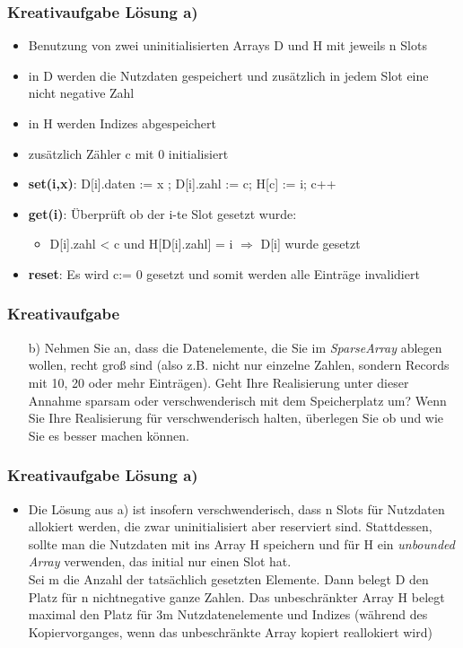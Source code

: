 \begin{frame}
	\frametitle{Kreativaufgabe Lösung a)}
	\begin{itemize}
		\item Benutzung von zwei uninitialisierten Arrays D und H mit jeweils n Slots
		\item in D werden die Nutzdaten gespeichert und zusätzlich in jedem Slot eine nicht negative Zahl
		\item in H werden Indizes abgespeichert
		\item zusätzlich Zähler c mit 0 initialisiert
		\item \textbf{set(i,x)}: D[i].daten := x ; D[i].zahl := c; H[c] := i; c++ 
		\item \textbf{get(i)}: Überprüft ob der i-te Slot gesetzt wurde:
			\begin{itemize}
				\item D[i].zahl < c und H[D[i].zahl] = i $\Rightarrow$ D[i] wurde gesetzt
			\end{itemize}
		\item \textbf{reset}: Es wird c:= 0 gesetzt und somit werden alle Einträge invalidiert

	\end{itemize}
\end{frame}

\begin{frame}
	\frametitle{Kreativaufgabe}

	\begin{itemize}
		\item[b)] Nehmen Sie an, dass die Datenelemente, die Sie im \textit{SparseArray} ablegen wollen, recht groß sind (also z.B. nicht nur einzelne Zahlen, sondern Records mit 10, 20 oder mehr Einträgen).
			Geht Ihre Realisierung unter dieser Annahme sparsam oder verschwenderisch mit dem Speicherplatz um? Wenn Sie Ihre Realisierung für verschwenderisch halten, überlegen Sie
			ob und wie Sie es besser machen können.
	\end{itemize}

\end{frame}
\begin{frame}
	\frametitle{Kreativaufgabe Lösung a)}
	\begin{itemize}
		\item Die Lösung aus a) ist insofern verschwenderisch, dass n Slots für Nutzdaten allokiert
		werden, die zwar uninitialisiert aber reserviert sind. Stattdessen, sollte man die Nutzdaten
		mit ins Array H speichern und für H ein \textit{unbounded Array} verwenden, das initial nur
		einen Slot hat.\\ Sei m die Anzahl der tatsächlich gesetzten Elemente. Dann belegt D den Platz für 
		n nichtnegative ganze Zahlen. Das unbeschränkter Array H belegt maximal den Platz für 3m
		Nutzdatenelemente und Indizes (während des Kopiervorganges, wenn das unbeschränkte
		Array kopiert reallokiert wird)
	\end{itemize}
\end{frame}


